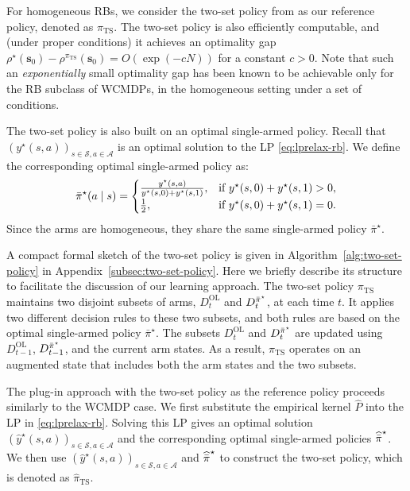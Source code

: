 \documentclass[mnsc,nonblindrev]{informs3}
\newcommand{\pibst}{\Bar{\pi}^\star}
\newcommand{\pihbst}{\widehat{\Bar{\pi}}^\star}
\newcommand{\pits}{\pi_{\mathrm{TS}}}
\newcommand{\pihts}{\widehat{\pi}_{\mathrm{TS}}}
\newcommand{\yhst}{\widehat{y}^\star}
\newcommand{\bms}{\bm{s}}
\newcommand{\States}{\mathcal{S}}
\newcommand{\Actions}{\mathcal{A}}
\begin{document}
For homogeneous RBs, we consider the two-set policy from \citet{hong2024achieving} as our reference policy, denoted as $\pits$.
The two-set policy is also efficiently computable, and (under proper conditions) it achieves an optimality gap $\rho^\star(\bms_0)-\rho^{\pits}(\bms_0)=O(\exp(-cN))$ for a constant $c>0$.
Note that such an \emph{exponentially} small optimality gap has been known to be achievable only for the RB subclass of WCMDPs, in the homogeneous setting under a set of conditions.

The two-set policy is also built on an optimal single-armed policy.
Recall that $(y^\star(s,a))_{s\in\mathcal S,a\in\mathcal A}$ is an optimal solution to the LP \eqref{eq:lprelax-rb}.
We define the corresponding optimal single-armed policy as:
\begin{equation}\label{eq:single-opt-RB}
\bar\pi^\star(a\mid s)=
\vspace{-0.05cm}\begin{cases}
\frac{y^\star(s,a)}{y^\star(s,0)+y^\star(s,1)}, &\text{if } y^\star(s,0)+y^\star(s,1)>0,\\
\frac{1}{2}, & \text{if }y^\star(s,0)+y^\star(s,1)=0.
\end{cases}
\end{equation}
Since the arms are homogeneous, they share the same single-armed policy $\bar\pi^\star$.

A compact formal sketch of the two-set policy is given in Algorithm~\ref{alg:two-set-policy} in Appendix~\ref{subsec:two-set-policy}.
Here we briefly describe its structure to facilitate the discussion of our learning approach.
The two-set policy $\pits$ maintains two disjoint subsets of arms, $D_t^{\mathrm{OL}}$ and $D_t^{\pibst}$, at each time $t$.
It applies two different decision rules to these two subsets, and both rules are based on the optimal single-armed policy $\bar\pi^\star$.
The subsets $D_t^{\mathrm{OL}}$ and $D_t^{\pibst}$ are updated using $D_{t-1}^{\mathrm{OL}}$, $D_{t-1}^{\pibst}$, and the current arm states.
As a result, $\pits$ operates on an augmented state that includes both the arm states and the two subsets.


The plug-in approach with the two-set policy as the reference policy proceeds similarly to the WCMDP case.
We first substitute the empirical kernel $\widehat P$ into the LP in \eqref{eq:lprelax-rb}.
Solving this LP gives an optimal solution $(\yhst(s,a))_{s\in\States,a\in\Actions}$ and the corresponding optimal single-armed policies $\pihbst$.
We then use $(\yhst(s,a))_{s\in\States,a\in\Actions}$ and $\pihbst$ to construct the two-set policy, which is denoted as $\pihts$.
\end{document}
